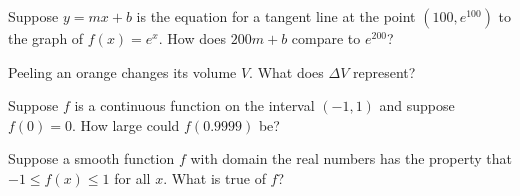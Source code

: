 \documentclass{ximera}
\newcommand{\recommendation}[1]{}
\newcommand{\GoodQuestions}[1]{}
\begin{document}
\begin{problem}
  Suppose $y = mx + b$ is the equation for a tangent line at the point $(100,e^{100})$ to the graph of $f(x) = e^x$.  How does $200m + b$ compare to $e^{200}$?
  \begin{multipleChoice}
  \end{multipleChoice}
\end{problem}




\begin{problem}
  \recommendation{Vic}
  \GoodQuestions{Subject: Linear approximation 7Q}
  
  Peeling an orange changes its volume $V$.  What does $\Delta V$
  represent?  
  \begin{multipleChoice}
  \end{multipleChoice}
\end{problem}




\begin{problem}
  Suppose $f$ is a continuous function on the interval $(-1,1)$ and suppose $f(0) = 0$.  How large could $f(0.9999)$ be?
  \begin{multipleChoice}
  \end{multipleChoice}
\end{problem}

\begin{problem}
  Suppose a smooth function $f$ with domain the real numbers has the property that $-1 \leq f(x) \leq 1$ for all $x$.  What is true of $f$?
  \begin{multipleChoice}
  \end{multipleChoice}
\end{problem}
\end{document}
